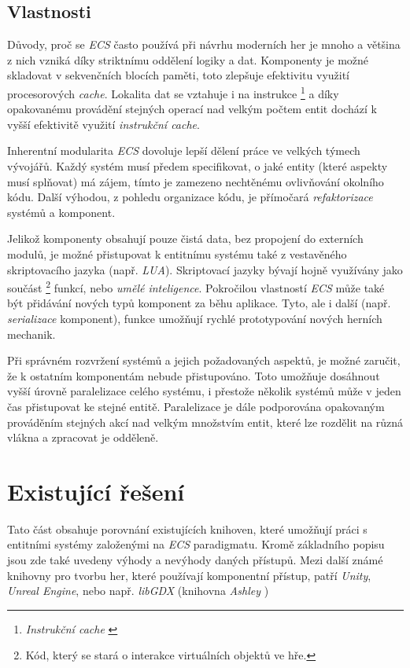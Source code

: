 \subsection{Vlastnosti}

Důvody, proč se \emph{ECS} často používá při návrhu moderních her je mnoho a většina z nich vzniká díky striktnímu oddělení logiky a dat. Komponenty je možné skladovat v sekvenčních blocích paměti, toto zlepšuje efektivitu využití procesorových \emph{cache}. Lokalita dat se vztahuje i na instrukce \cite{InstrAreData} \footnote{\emph{Instrukční cache} \cite{CpuMemoryGap}} a díky opakovanému provádění stejných operací nad velkým počtem entit dochází k vyšší efektivitě využití \emph{instrukční cache}. 

Inherentní modularita \emph{ECS} dovoluje lepší dělení práce ve velkých týmech vývojářů. Každý systém musí předem specifikovat, o jaké entity (které aspekty musí splňovat) má zájem, tímto je zamezeno nechtěnému ovlivňování okolního kódu. Další výhodou, z pohledu organizace kódu, je přímočará \emph{refaktorizace} systémů a komponent.

Jelikož komponenty obsahují pouze čistá data, bez propojení do externích modulů, je možné přistupovat k entitnímu systému také z vestavěného skriptovacího jazyka (např. \emph{LUA}). Skriptovací jazyky bývají hojně využívány jako součást  \footnote{Kód, který se stará o interakce virtuálních objektů ve hře.} funkcí, nebo \emph{umělé inteligence}. Pokročilou vlastností \emph{ECS} může také být přidávání nových typů komponent za běhu aplikace. Tyto, ale i další (např. \emph{serializace} komponent), funkce umožňují rychlé prototypování nových herních mechanik.

Při správném rozvržení systémů a jejich požadovaných aspektů, je možné zaručit, že k ostatním komponentám nebude přistupováno. Toto umožňuje dosáhnout vyšší úrovně paralelizace celého systému, i přestože několik systémů může v jeden čas přistupovat ke stejné entitě. Paralelizace je dále podporována opakovaným prováděním stejných akcí nad velkým množstvím entit, které lze rozdělit na různá vlákna a zpracovat je odděleně.

\section{Existující řešení}

Tato část obsahuje porovnání existujících knihoven, které umožňují práci s entitními systémy založenými na \emph{ECS} paradigmatu. Kromě základního popisu jsou zde také uvedeny výhody a nevýhody daných přístupů. Mezi další známé knihovny pro tvorbu her, které používají komponentní přístup, patří \emph{Unity}, \emph{Unreal Engine}, nebo např. \emph{libGDX} (knihovna \emph{Ashley} \cite{Ashley})


